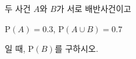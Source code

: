두 사건 $A$와 $B$가 서로 배반사건이고\par\smallskip\noindent\hspace*{1.5em}$\mathrm{P}(A)=0.3$, $\mathrm{P}(A\cup B)=0.7$\par\smallskip\noindent 일 때, $\mathrm{P}(B)$를 구하시오.
